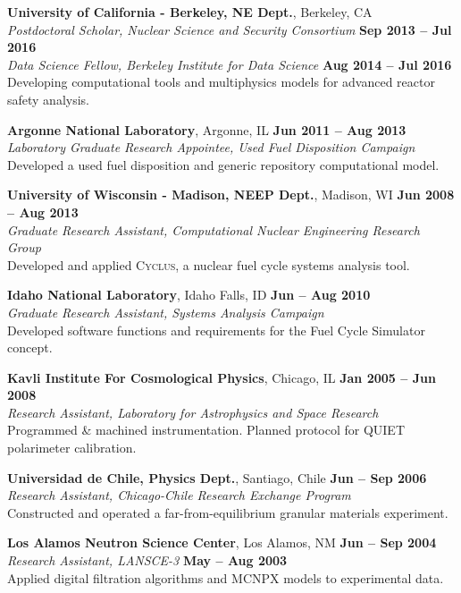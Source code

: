 \documentclass[margin,line]{resume}
\newcommand{\Cyclus}{\textsc{Cyclus}\xspace}%
\begin{document}
\begin{resume}
    \textbf{University of California - Berkeley, NE Dept.}, Berkeley, CA \\
		\textsl{Postdoctoral Scholar, Nuclear Science and Security Consortium} \hfill \textbf{Sep 2013 -- Jul 2016}\\
		\textsl{Data Science Fellow, Berkeley Institute for Data Science} \hfill \textbf{Aug 2014 -- Jul 2016}\\
                Developing computational tools and multiphysics models for advanced reactor safety analysis.

    \textbf{Argonne National Laboratory}, Argonne, IL \hfill \textbf{Jun 2011 -- Aug 2013}\\
		\textsl{Laboratory Graduate Research Appointee, Used Fuel Disposition Campaign}\\
		Developed a used fuel disposition and generic repository computational model.

    \textbf{University of Wisconsin - Madison, NEEP Dept.}, Madison, WI \hfill \textbf{Jun 2008 -- Aug 2013}\\
		\textsl{Graduate Research Assistant, Computational Nuclear Engineering Research Group}\\
		Developed and applied \Cyclus, a nuclear fuel cycle systems analysis tool.

    \textbf{Idaho National Laboratory}, Idaho Falls, ID \hfill \textbf{Jun -- Aug 2010}\\
		\textsl{Graduate Research Assistant, Systems Analysis Campaign}\\
		Developed software functions and requirements for the Fuel Cycle Simulator concept.

    \textbf{Kavli Institute For Cosmological Physics}, Chicago, IL \hfill \textbf{Jan 2005 -- Jun 2008}\\
                \textsl{Research Assistant, Laboratory for Astrophysics and Space Research}\\
                Programmed \& machined instrumentation. Planned protocol for QUIET polarimeter calibration.

    \textbf{Universidad de Chile, Physics Dept.}, Santiago, Chile \hfill \textbf{Jun -- Sep 2006}\\
                \textsl{Research Assistant, Chicago-Chile Research Exchange Program}\\
                 Constructed and operated a far-from-equilibrium granular materials experiment.

                \pagebreak
    \textbf{Los Alamos Neutron Science Center}, Los Alamos, NM \hfill \textbf{Jun -- Sep 2004}\\
                \textsl{Research Assistant, LANSCE-3} \hfill \textbf{May -- Aug 2003}\\
                Applied digital filtration algorithms and MCNPX models to experimental data.


\end{resume}
\end{document}
